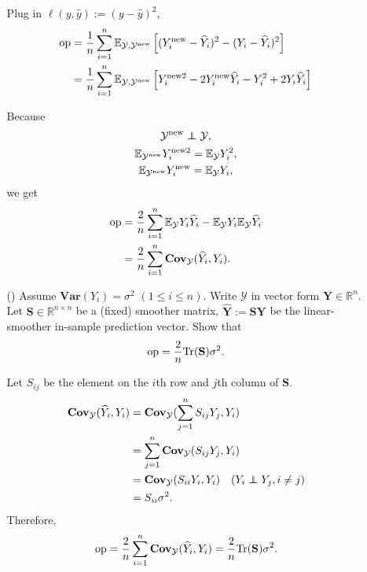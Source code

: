 \documentclass[10pt]{article}
\theoremstyle{definition}
\theoremstyle{remark}
\newcommand{\Sbb}{\mathbf{S}}
\newcommand{\bY}{\bm{Y}}
\newcommand{\bbE}{\mathbb{E}}
\newcommand{\bbR}{\mathbb{R}}
\newcommand{\cY}{\mathcal{Y}}
\newcommand{\bVar}{\mathbf{Var}}	%
\newcommand{\bCov}{\mathbf{Cov}}	%
\newcommand{\Tr}{\mathrm{Tr}}	    %
\newcommand{\new}{\mathrm{new}}		%
\newcommand{\op}{\mathrm{op}}		%
\newcommand\indep{\protect\mathpalette{\protect\independenT}{\perp}}
\def\independenT#1#2{\mathrel{\rlap{$#1#2$}\mkern2mu{#1#2}}}	%
\begin{document}
\begin{enumerate}
\begin{itemize}
		Plug in $ \ell(y,\widehat{y}) := (y - \widehat{y})^{2} $,
		\begin{align*}
		    \op & = {1 \over n}\sum_{i=1}^{n}\bbE_{\cY,\cY^{\new}}\left[ (Y_{i}^{\new}-\widehat{Y}_{i})^2 - (Y_{i}-\widehat{Y}_{i})^2 \right] \\
		    & = {1 \over n}\sum_{i=1}^{n}\bbE_{\cY,\cY^{\new}}\left[ Y_{i}^{\new 2} - 2Y_{i}^{\new}\widehat{Y}_{i} - Y_{i}^2 + 2Y_{i}\widehat{Y}_{i} \right]
		\end{align*}
		
		Because
		\begin{gather*}
		    \cY^{\new} \indep \cY, \\
		    \bbE_{\cY^{\new}} Y_{i}^{\new 2} = \bbE_{\cY} Y_{i}^{2}, \\
		    \bbE_{\cY^{\new}} Y_{i}^{\new} = \bbE_{\cY} Y_{i},
		\end{gather*}
		we get
		\begin{align*}
		    \op & = {2 \over n}\sum_{i=1}^{n}\bbE_{\cY} Y_{i}\widehat{Y}_{i}  - \bbE_{\cY} Y_{i} \bbE_{\cY} \widehat{Y}_{i} \\
		    & = {2 \over n}\sum_{i=1}^{n}\bCov_{\cY}( \widehat{Y}_{i},Y_{i} ).
		\end{align*}
		
		\item [(\Romannum{2})] Assume $ \bVar(Y_{i}) = \sigma^{2} $ $ (1 \le i \le n) $. Write $ \cY $ in vector form $ \bY \in \bbR^{n} $. Let $ \Sbb \in \bbR^{n \times n} $ be a (fixed) smoother matrix, $ \widehat{\bY} := \Sbb\bY $ be the linear-smoother in-sample prediction vector. Show that
		\[ \op = {2 \over n}\Tr(\Sbb)\sigma^{2}. \]
		
		Let $S_{ij}$ be the element on the $i$th row and $j$th column of $\Sbb$.
		\begin{align*}
		    \bCov_{\cY}( \widehat{Y}_{i},Y_{i} ) & = \bCov_{\cY}( \sum_{j=1}^{n} S_{ij} Y_j, Y_i ) \\
		    & = \sum_{j=1}^{n} \bCov_{\cY}( S_{ij} Y_j, Y_i ) \\
		    & = \bCov_{\cY}( S_{ii} Y_i, Y_i ) \quad (Y_i \indep Y_j ,i\ne j)\\
		    & = S_{ii} \sigma^2.
		\end{align*}
		Therefore,
		\[ \op = {2 \over n}\sum_{i=1}^{n}\bCov_{\cY}( \widehat{Y}_{i},Y_{i} ) = {2 \over n}\Tr(\Sbb)\sigma^{2}. \]
	\end{itemize}
	

\end{enumerate}
\end{document}
